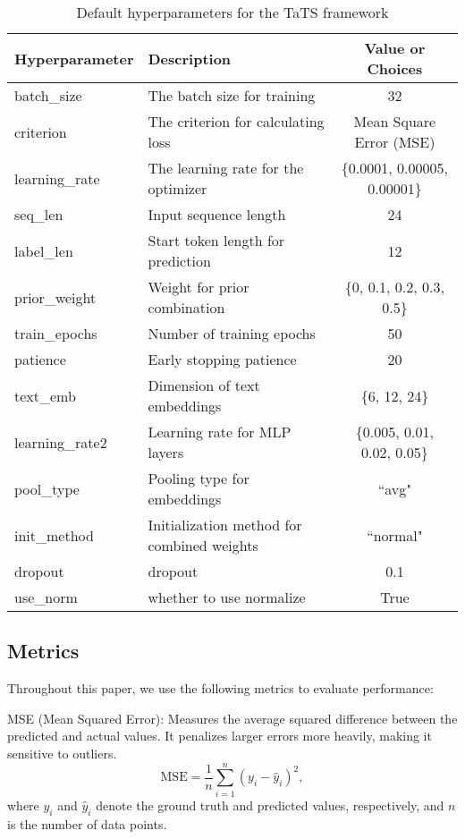 \begin{table}[t]
\caption{Default hyperparameters for the TaTS framework}
\label{TB: hyper}
\vspace{3mm}
\begin{center}
\begin{tabular}{llc}
\toprule
Hyperparameter & Description & Value or Choices \\
\midrule
batch\_size & The batch size for training & 32 \\
criterion & The criterion for calculating loss & Mean Square Error (MSE)  \\
learning\_rate & The learning rate for the optimizer  & \{0.0001, 0.00005, 0.00001\} \\
seq\_len & Input sequence length & 24 \\
label\_len & Start token length for prediction & 12 \\
prior\_weight & Weight for prior combination & \{0, 0.1, 0.2, 0.3, 0.5\} \\
train\_epochs & Number of training epochs & 50 \\
patience & Early stopping patience & 20 \\
text\_emb & Dimension of text embeddings & \{6, 12, 24\} \\
learning\_rate2 & Learning rate for MLP layers & \{0.005, 0.01, 0.02, 0.05\} \\
pool\_type & Pooling type for embeddings & ``avg" \\
init\_method & Initialization method for combined weights & ``normal" \\
dropout & dropout & 0.1 \\
use\_norm & whether to use normalize & True \\
\bottomrule
\end{tabular}
\end{center}
\end{table}




\subsection{Metrics}
Throughout this paper, we use the following metrics to evaluate performance:

MSE (Mean Squared Error): Measures the average squared difference between the predicted and actual values. It penalizes larger errors more heavily, making it sensitive to outliers.
\begin{equation}
\text{MSE} = \frac{1}{n} \sum_{i=1}^n \left( y_i - \hat{y}_i \right)^2,
\end{equation}
where $y_i$ and $\hat{y}_i$ denote the ground truth and predicted values, respectively, and $n$ is the number of data points.

